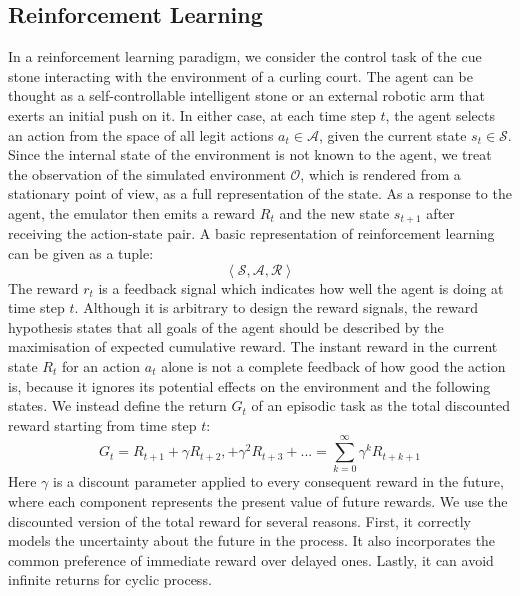 \documentclass[oneside,11pt,a4paper]{article}
\begin{document}
\subsection{Reinforcement Learning}
In a reinforcement learning paradigm, we consider the control task of the cue stone interacting with the environment of a curling court. The agent can be thought as a self-controllable intelligent stone or an external robotic arm that exerts an initial push on it. In either case, at each time step $t$, the agent selects an action from the space of all legit actions $a_t \in\mathcal A$, given the current state $s_t \in \mathcal S$. Since the internal state of the environment is not known to the agent, we treat the observation of the simulated environment $\mathcal O$, which is rendered from a stationary point of view, as a full representation of the state. As a response to the agent, the emulator then emits a reward $R_t$ and the new state $s_{t+1}$ after receiving the action-state pair. A basic representation of reinforcement learning can be given as a tuple:
$$
\left\langle \mathcal {S,A, R} \right\rangle
$$
The reward $r_t$ is a feedback signal which indicates how well the agent is doing at time step $t$. Although it is arbitrary to design the reward signals, the reward hypothesis states that all goals of the agent should be described by the maximisation of expected cumulative reward. The instant reward in the current state $R_t$ for an action $a_t$ alone is not a complete feedback of how good the action is, because it ignores its potential effects on the environment and the following states. We instead define the return $G_t$ of an episodic task as the total discounted reward starting from time step $t$:
$$
G_t = R_{t+1} + \gamma R_{t+2}, +\gamma^2 R_{t+3}+... = \sum_{k=0}^\infty\gamma^kR_{t+k+1}
$$
Here $\gamma$ is a discount parameter applied to every consequent reward in the future, where each component represents the present value of future rewards. We use the discounted version of the total reward for several reasons. First, it correctly models the uncertainty about the future in the process. It also incorporates the common preference of immediate reward over delayed ones. Lastly, it can avoid infinite returns for cyclic process.
\newline
\newline
\noindent
\end{document}
